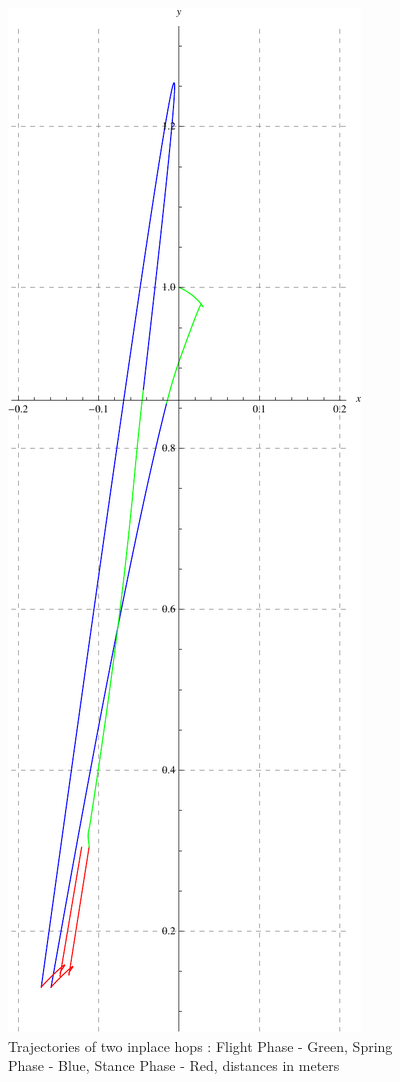 \begin{figure}[!htp]
\centering
\includegraphics[scale=0.6]{fig/plot_inplace.pdf}
\caption[Trajectories of two inplace hops]{Trajectories of two inplace hops : Flight Phase - Green, Spring Phase - Blue, Stance Phase - Red, distances in meters}
\label{fig:4_inplace_trajec}
\end{figure}


